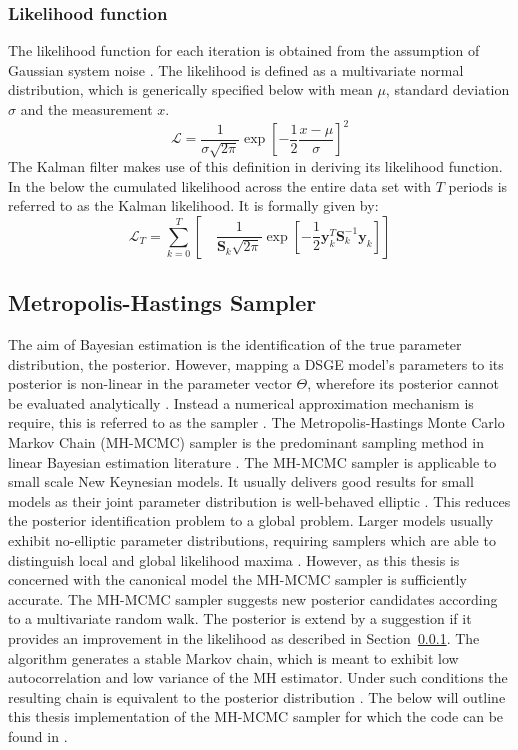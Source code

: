 \documentclass[12pt,a4paper,english]{article} %
\newcommand{\matr}[1]{\mathbf{#1}} %
\newcommand{\Lagr}{\mathcal{L}} %
\begin{document}
	\subsubsection{Likelihood function} \label{kalman_ll}
	The likelihood function for each iteration is obtained from the assumption of Gaussian system noise \cite{kalman_new_1960}. The likelihood is defined as a multivariate normal distribution, which is generically specified below with mean $\mu$, standard deviation $\sigma$ and the measurement $x$.
	\begin{equation}
		\Lagr = \frac{1}{\sigma \sqrt{2 \pi}} \exp [- \frac{1}{2} \frac{x - \mu}{\sigma}]^2
	\end{equation}
	The Kalman filter makes use of this definition in deriving its likelihood function. In the below the cumulated likelihood across the entire data set with $T$ periods is referred to as the Kalman likelihood. It is formally given by:
	\begin{equation}
		\Lagr_T = \sum_{k=0}^{T} \left[ \quad \frac{1}{\matr{S}_k \sqrt{2 \pi}} \exp [- \frac{1}{2} \matr{y}_k^{T} \matr{S}_{k}^{-1} \matr{y}_k] \right]
	\end{equation}
		
	\subsection{Metropolis-Hastings Sampler}
	The aim of Bayesian estimation is the identification of the true parameter distribution, the posterior. However, mapping a DSGE model's parameters to its posterior is non-linear in the parameter vector $\Theta$, wherefore its posterior cannot be evaluated analytically \cite{herbst_bayesian_2016}. Instead a numerical approximation mechanism is require, this is referred to as the sampler \cite{guerron-quintana_bayesian_2013}. The Metropolis-Hastings Monte Carlo Markov Chain (MH-MCMC) sampler is the predominant sampling method in linear Bayesian estimation literature \cite{guerron-quintana_bayesian_2013}. The MH-MCMC sampler is applicable to small scale New Keynesian models. It usually delivers good results for small models as their joint parameter distribution is well-behaved elliptic \cite{herbst_bayesian_2016}. This reduces the posterior identification problem to a global problem. Larger models usually exhibit no-elliptic parameter distributions, requiring samplers which are able to distinguish local and global likelihood maxima \cite{herbst_bayesian_2016}. However, as this thesis is concerned with the canonical model the MH-MCMC sampler is sufficiently accurate.	
	The MH-MCMC sampler suggests new posterior candidates according to a multivariate random walk. The posterior is extend by a suggestion if it provides an improvement in the likelihood as described in Section~\ref{kalman_ll}. The algorithm generates a stable Markov chain, which is meant to exhibit low autocorrelation and low variance of the MH estimator. Under such conditions the resulting chain is equivalent to the posterior distribution \cite{herbst_bayesian_2016}. The below will outline this thesis implementation of the MH-MCMC sampler for which the code can be found in . 
	
\end{document}
